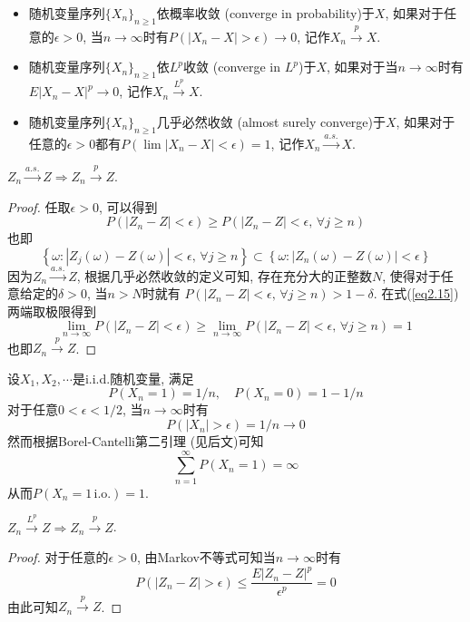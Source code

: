\documentclass[cn, 12pt, math=mtpro2, bibstyle=apa, blue, twocol]{elegantbook}
\newcommand{\limn}{\lim_{n\to\infty}}
\begin{document}
\begin{definition}
\begin{itemize}
\item 随机变量序列$\{X_n\}_{n\ge1}$依概率收敛 (converge in probability)于$X$, 如果对于任意的$\epsilon>0$, 当$n\to\infty$时有$P(|X_n-X|>\epsilon)\to0$, 记作$X_n\xrightarrow{p}X$.
\item 随机变量序列$\{X_n\}_{n\ge1}$依$L^p$收敛 (converge in $L^p$)于$X$, 如果对于当$n\to\infty$时有$E|X_n-X|^p\to0$, 记作$X_n\xrightarrow{L^p}X$.
\item 随机变量序列$\{X_n\}_{n\ge1}$几乎必然收敛 (almost surely converge)于$X$, 如果对于任意的$\epsilon>0$都有$P(\lim |X_n-X|<\epsilon)=1$, 记作$X_n\xrightarrow{a.s.}X$.
\end{itemize}
\end{definition}
\begin{theorem}
$Z_n\xrightarrow{a.s.}Z\Rightarrow Z_n\xrightarrow{p}Z$.
\end{theorem}
\begin{proof}
  任取$\epsilon>0$, 可以得到
  \begin{equation}\label{eq2.15}
    P(|Z_n-Z|<\epsilon)\geq P(|Z_n-Z|<\epsilon,\,\forall j\geq n)
  \end{equation}
  也即
  $$\left\{\omega: |Z_j(\omega)-Z(\omega)|<\epsilon,\,\forall j\geq n\right\}\subset\left\{\omega: |Z_n(\omega)-Z(\omega)|<\epsilon\right\}$$
  因为$Z_n\xrightarrow{a.s.}Z$, 根据几乎必然收敛的定义可知, 存在充分大的正整数$N$, 使得对于任意给定的$\delta>0$, 当$n>N$时就有
  $P(|Z_n-Z|<\epsilon,\,\forall j\geq n)>1-\delta$. 在式(\ref{eq2.15})两端取极限得到
  $$\limn P(|Z_n-Z|<\epsilon)\geq \limn P(|Z_n-Z|<\epsilon,\,\forall j\geq n)=1$$
  也即$Z_n\xrightarrow{p}Z$.
\end{proof}
\begin{example}[依概率收敛但不几乎必然收敛]
设$X_1,X_2,\cdots$是i.i.d.随机变量, 满足
$$P(X_n=1)=1/n,\quad P(X_n=0)=1-1/n$$
对于任意$0<\epsilon<1/2$, 当$n\to\infty$时有
$$P(|X_n|>\epsilon)=1/n\to 0$$
然而根据Borel-Cantelli第二引理 (见后文)可知
$$\sum_{n=1}^{\infty} P(X_n=1)=\infty$$从而$P(X_n=1\,\text{i.o.})=1$.
\end{example}
\begin{theorem}\label{thm:thm2.12}
$Z_n\xrightarrow{L^p}Z\Rightarrow Z_n\xrightarrow{p}Z$.
\end{theorem}
\begin{proof}
对于任意的$\epsilon>0$, 由Markov不等式可知当$n\to\infty$时有
$$P(|Z_n-Z|>\epsilon)\leq \frac{E|Z_n-Z|^p}{\epsilon^p}=0$$
由此可知$Z_n\xrightarrow{p}Z$.
\end{proof}
\end{document}
